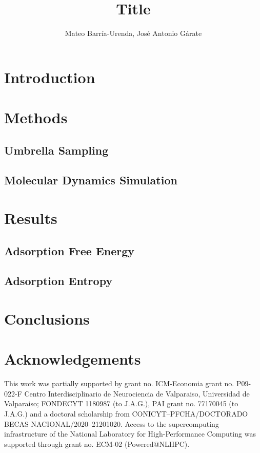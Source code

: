 \documentclass[twoside,twocolumn,9pt]{article}
\author{Mateo Barría-Urenda, José Antonio Gárate}
\title{Title}
\date{}
\begin{document}
\maketitle

\abstract{}

\section{Introduction}

\section{Methods}

\subsection{Umbrella Sampling}

\subsection{Molecular Dynamics Simulation}

\section{Results}

\subsection{Adsorption Free Energy}

\subsection{Adsorption Entropy}

\section{Conclusions}


\section*{Acknowledgements}
This work was partially supported by grant no. ICM-Economia grant no. P09-022-F Centro Interdisciplinario de Neurociencia de Valparaiso, Universidad de Valparaiso; FONDECYT 1180987 (to J.A.G.), PAI grant no. 77170045 (to J.A.G.) and a doctoral scholarship from CONICYT--PFCHA/DOCTORADO BECAS NACIONAL/2020--21201020. Access to the supercomputing infrastructure of the National Laboratory for High-Performance Computing was supported through grant no. ECM-02 (Powered@NLHPC).




\end{document}
